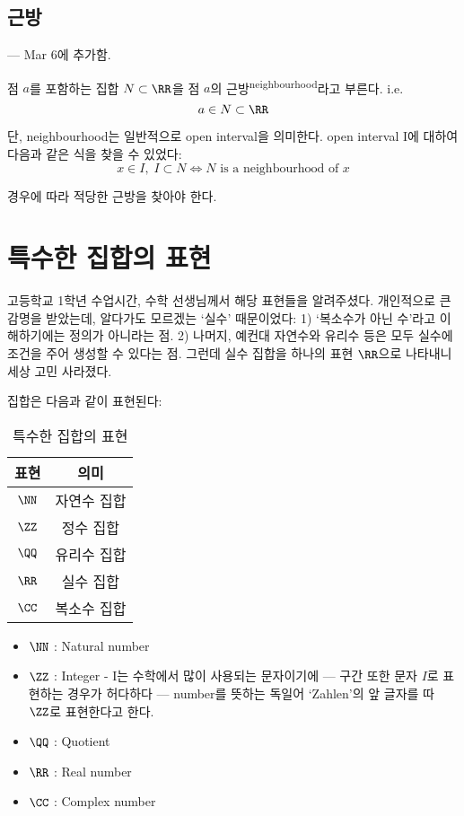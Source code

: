 \documentclass[../note.tex]{subfiles}
\begin{document}
\subsection{근방}
--- Mar 6에 추가함.
\begin{definition}[근방]
  점 $a$를 포함하는 집합 $N \subset \RR$을 점 $a$의 근방\textsuperscript{neighbourhood}라고 부른다. i.e.
  \begin{equation}
    a \in N \subset \RR
  \end{equation}

  단, neighbourhood는 일반적으로 open interval을 의미한다. open interval I에 대하여 다음과 같은 식을 찾을 수 있었다:
  \begin{equation}
    x \in I,\; I \subset N \Longleftrightarrow N \text{ is a neighbourhood of } x
  \end{equation}
\end{definition}
경우에 따라 적당한 근방을 찾아야 한다.

\section{특수한 집합의 표현}
고등학교 1학년 수업시간, 수학 선생님께서 해당 표현들을 알려주셨다. 개인적으로 큰 감명을 받았는데, 알다가도 모르겠는 `실수' 때문이었다: 1) `복소수가 아닌 수'라고 이해하기에는 정의가 아니라는 점. 2) 나머지, 예컨대 자연수와 유리수 등은 모두 실수에 조건을 주어 생성할 수 있다는 점. 그런데 실수 집합을 하나의 표현 $\RR$으로 나타내니 세상 고민 사라졌다.

\begin{note}
  집합은 다음과 같이 표현된다:
  \begin{table}[H]
    \centering
    \begin{tabular}{ c c }
      표현 & 의미 \\
      \hline
      $\NN$ & 자연수 집합 \\
      $\ZZ$ & 정수 집합 \\
      $\QQ$ & 유리수 집합 \\
      $\RR$ & 실수 집합 \\
      $\CC$ & 복소수 집합 \\
    \end{tabular}
    \caption{특수한 집합의 표현}
  \end{table}
\end{note}

\begin{itemize}
  \item
    $\NN$ : Natural number
  \item
    $\ZZ$ : Integer - I는 수학에서 많이 사용되는 문자이기에 --- 구간 또한 문자 $I$로 표현하는 경우가 허다하다 --- number를 뜻하는 독일어 `Zahlen'의 앞 글자를 따 $\ZZ$로 표현한다고 한다.
  \item
    $\QQ$ : Quotient
  \item
    $\RR$ : Real number
  \item
    $\CC$ : Complex number
\end{itemize}
\end{document}
